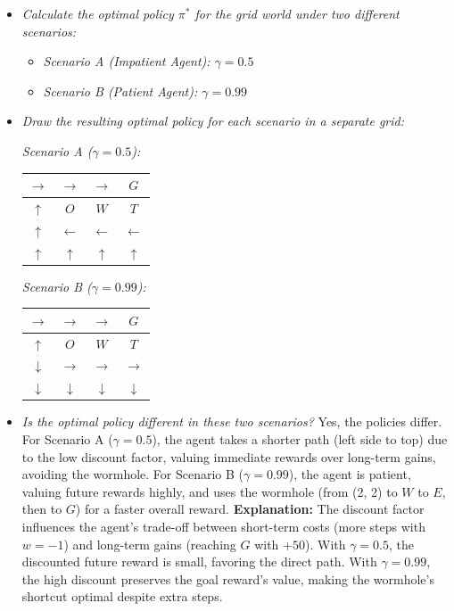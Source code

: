 \documentclass{article}
\begin{document}
\begin{itemize}
    \item \textit{Calculate the optimal policy $\pi^*$ for the grid world under two different scenarios:}
      \begin{itemize}
          \item \textit{Scenario A (Impatient Agent): $\gamma = 0.5$}
          \item \textit{Scenario B (Patient Agent): $\gamma = 0.99$}
      \end{itemize}
    \item \textit{Draw the resulting optimal policy for each scenario in a separate grid:}
      \begin{center}
      \textit{Scenario A ($\gamma = 0.5$):}
      \begin{tabular}{|c|c|c|c|}
      \hline
      $\rightarrow$ & $\rightarrow$ & $\rightarrow$ & $G$ \\
      \hline
      $\uparrow$ & $O$ & $W$ & $T$ \\
      \hline
      $\uparrow$ & $\leftarrow$ & $\leftarrow$ & $\leftarrow$ \\
      \hline
      $\uparrow$ & $\uparrow$ & $\uparrow$ & $\uparrow$ \\
      \hline
      \end{tabular}
      \end{center}

      \begin{center}
      \textit{Scenario B ($\gamma = 0.99$):}
      \begin{tabular}{|c|c|c|c|}
      \hline
      $\rightarrow$ & $\rightarrow$ & $\rightarrow$ & $G$ \\
      \hline
      $\uparrow$ & $O$ & $W$ & $T$ \\
      \hline
      $\downarrow$ & $\rightarrow$ & $\rightarrow$ & $\rightarrow$ \\
      \hline
      $\downarrow$ & $\downarrow$ & $\downarrow$ & $\downarrow$ \\
      \hline
      \end{tabular}
      \end{center}
    \item \textit{Is the optimal policy different in these two scenarios?} Yes, the policies differ. For Scenario A ($\gamma = 0.5$), the agent takes a shorter path (left side to top) due to the low discount factor, valuing immediate rewards over long-term gains, avoiding the wormhole. For Scenario B ($\gamma = 0.99$), the agent is patient, valuing future rewards highly, and uses the wormhole (from (2, 2) to $W$ to $E$, then to $G$) for a faster overall reward. \textbf{Explanation:} The discount factor influences the agent's trade-off between short-term costs (more steps with $w = -1$) and long-term gains (reaching $G$ with $+50$). With $\gamma = 0.5$, the discounted future reward is small, favoring the direct path. With $\gamma = 0.99$, the high discount preserves the goal reward's value, making the wormhole's shortcut optimal despite extra steps.
\end{itemize}
\end{document}
